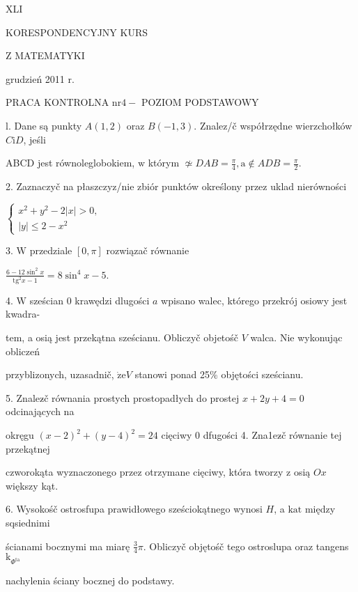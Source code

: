 \documentclass[a4paper,12pt]{article}
\begin{document}
XLI

KORESPONDENCYJNY KURS

Z MATEMATYKI

grudzień 2011 r.

PRACA KONTROLNA $\mathrm{n}\mathrm{r} 4-$ POZIOM PODSTAWOWY

l. Dane są punkty $A(1,2)$ oraz $B(-1,3)$. Znalez/č współrzędne wierzchołków $C\mathrm{i}D$, jeśli

ABCD jest równoleglobokiem, $\mathrm{w}$ którym $\displaystyle \not\simeq DAB=\frac{\pi}{4}, \displaystyle \mathrm{a}\not\in ADB=\frac{\pi}{2}.$

2. Zaznaczyč na płaszczyz/nie zbiór punktów określony przez uklad nierówności

$\left\{\begin{array}{l}
x^{2}+y^{2}-2|x|>0,\\
|y|\leq 2-x^{2}
\end{array}\right.$

3. $\mathrm{W}$ przedziale $[0,\pi]$ rozwiązač równanie

$\displaystyle \frac{6-12\sin^{2}x}{\mathrm{t}\mathrm{g}^{2}x-1}=8\sin^{4}x-5.$

4. $\mathrm{W}$ sześcian $0$ krawędzi dlugości $a$ wpisano walec, którego przekrój osiowy jest kwadra-

tem, a osią jest przekątna sześcianu. Obliczyč objetośč $V$ walca. Nie wykonując obliczeń

przyblizonych, uzasadnič, $\dot{\mathrm{z}}\mathrm{e}V$ stanowi ponad 25\% objętości sześcianu.

5. Znalez$\acute{}$č równania prostych prostopadłych do prostej $x+2y+4 = 0$ odcinających na

okręgu $(x-2)^{2}+(y-4)^{2} =24$ cięciwy $0$ dfugości 4. Zna1ez$\acute{}$č równanie tej przekątnej

czworokąta wyznaczonego przez otrzymane cięciwy, która tworzy $\mathrm{z}$ osią $Ox$ większy kąt.

6. Wysokośč ostrosfupa prawidłowego sześciokątnego wynosi $H$, a $\mathrm{k}\mathrm{a}\mathrm{t}$ między sqsiednimi

ścianami bocznymi ma miarę $\displaystyle \frac{3}{4}\pi$. Obliczyč objętośč tego ostroslupa oraz tangens $\mathrm{k}_{\Phi^{\mathrm{t}\mathrm{a}}}$

nachylenia ściany bocznej do podstawy.
\end{document}
